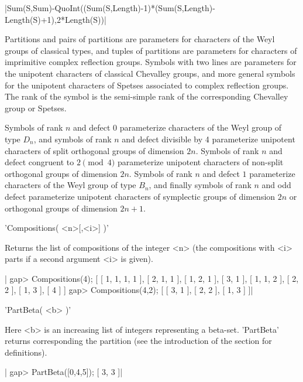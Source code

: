 |Sum(S,Sum)-QuoInt((Sum(S,Length)-1)*(Sum(S,Length)-Length(S)+1),2*Length(S))|

Partitions and pairs of partitions  are parameters for characters of the
Weyl groups of classical types,  and tuples of partitions are parameters
for characters  of imprimitive  complex reflection groups.  Symbols with
two  lines are  parameters  for the  unipotent  characters of  classical
Chevalley groups, and more general  symbols for the unipotent characters
of  Spetses associated  to complex  reflection groups.  The rank  of the
symbol is the  semi-simple rank of the corresponding  Chevalley group or
Spetses.

Symbols of rank  $n$ and defect $0$ parameterize characters  of the Weyl
group of  type $D_n$, and  symbols of rank  $n$ and defect  divisible by
4  parameterize  unipotent  characters  of split  orthogonal  groups  of
dimension $2n$. Symbols of rank $n$  and defect congruent to $2 \pmod 4$
parameterize  unipotent characters  of  non-split  orthogonal groups  of
dimension  $2n$.  Symbols  of  rank  $n$  and  defect  $1$  parameterize
characters of the Weyl group of  type $B_n$, and finally symbols of rank
$n$  and  odd defect  parameterize  unipotent  characters of  symplectic
groups of dimension $2n$ or orthogonal groups of dimension $2n+1$.

%
%

'Compositions( <n>[,<i>] )'

Returns  the list of compositions of the integer <n> (the compositions with
<i> parts if a second argument <i> is given).

|    gap> Compositions(4);
    [ [ 1, 1, 1, 1 ], [ 2, 1, 1 ], [ 1, 2, 1 ], [ 3, 1 ], [ 1, 1, 2 ], 
      [ 2, 2 ], [ 1, 3 ], [ 4 ] ]
    gap> Compositions(4,2);
    [ [ 3, 1 ], [ 2, 2 ], [ 1, 3 ] ]|

%
%

'PartBeta( <b> )'

Here  <b>  is  an  increasing  list  of  integers  representing a beta-set.
'PartBeta' returns corresponding the partition (see the introduction of the
section for definitions).

|    gap> PartBeta([0,4,5]);
      [ 3, 3 ]|

%
%


